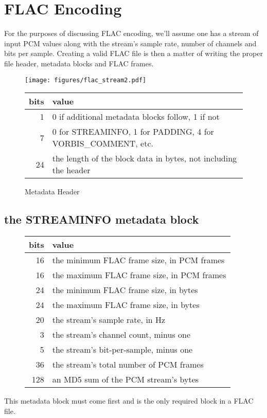 \section{FLAC Encoding}
For the purposes of discussing FLAC encoding,
we'll assume one has a stream of input PCM values along with the
stream's sample rate, number of channels and bits per sample.
Creating a valid FLAC file is then a matter of writing the proper
file header, metadata blocks and FLAC frames.
\begin{figure}[h]
\texttt{[image: figures/flac\_stream2.pdf]}
\end{figure}

\begin{figure}[h]
\begin{tabular}{|r|l|}
\hline
bits & value \\
\hline
1 & 0 if additional metadata blocks follow, 1 if not \\
7 & 0 for STREAMINFO, 1 for PADDING, 4 for VORBIS\_COMMENT, etc. \\
24 & the length of the block data in bytes, not including the header \\
\hline
\end{tabular}
\caption{Metadata Header}
\end{figure}

\subsection{the STREAMINFO metadata block}
\begin{figure}[h]
\begin{tabular}{|r|l|}
\hline
bits & value \\
\hline
16 & the minimum FLAC frame size, in PCM frames \\
16 & the maximum FLAC frame size, in PCM frames \\
24 & the minimum FLAC frame size, in bytes \\
24 & the maximum FLAC frame size, in bytes \\
20 & the stream's sample rate, in Hz \\
3 & the stream's channel count, minus one \\
5 & the stream's bit-per-sample, minus one \\
36 & the stream's total number of PCM frames \\
128 & an MD5 sum of the PCM stream's bytes \\
\hline
\end{tabular}
\end{figure}
\par
\noindent
This metadata block must come first and is the only required block
in a FLAC file.

